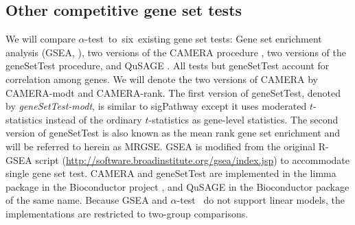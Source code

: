 \documentclass[useAMS,usenatbib, galley]{biom}
\newcommand{\OurMethod}{$\alpha$-test}
\newcommand{\HowmanyTest}{six}
\begin{document}
	\subsection{Other competitive gene set tests}
	We will compare \OurMethod~to~\HowmanyTest~existing gene set tests: Gene set enrichment analysis (GSEA, \cite{subramanian2005gene}), two versions of the CAMERA procedure \citep{wu2012camera}, two versions of the geneSetTest procedure, and QuSAGE \citep{yaari2013quantitative}. All tests but geneSetTest account for correlation among genes. We will denote the two versions of CAMERA by CAMERA-modt and CAMERA-rank. The first version of geneSetTest, denoted by \textit{geneSetTest-modt}, is similar to sigPathway \citep{tian2005discovering} except it uses moderated $t$-statistics instead of the ordinary $t$-statistics as gene-level statistics. The second version of geneSetTest is also known as the mean rank gene set enrichment \citep{michaud2008integrative} and will be referred to herein as MRGSE. GSEA is modified from the original R-GSEA script (\url{http://software.broadinstitute.org/gsea/index.jsp}) to accommodate single gene set test. CAMERA and geneSetTest are implemented  in the limma package \citep{smyth2005limma} in the Bioconductor project \citep{gentleman2004bioconductor}, and QuSAGE in the Bioconductor package of the same name. Because GSEA and \OurMethod~ do not support linear models, the implementations are restricted to two-group comparisons.
	
\end{document}
